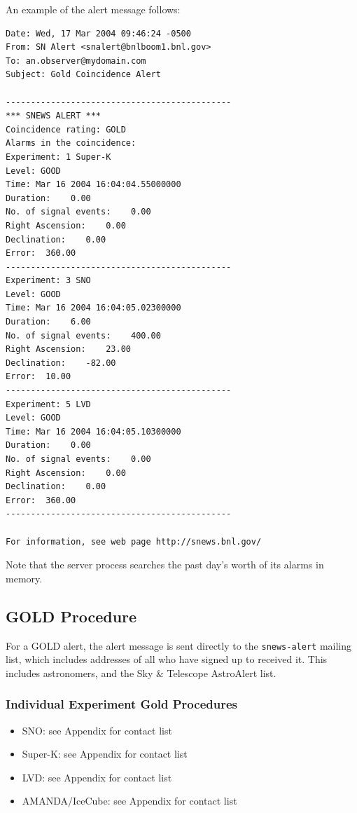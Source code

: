 \documentclass{article}
\begin{document}
An example of the alert message follows:

\begin{verbatim}
Date: Wed, 17 Mar 2004 09:46:24 -0500
From: SN Alert <snalert@bnlboom1.bnl.gov>
To: an.observer@mydomain.com
Subject: Gold Coincidence Alert

---------------------------------------------
*** SNEWS ALERT ***
Coincidence rating: GOLD
Alarms in the coincidence:
Experiment: 1 Super-K
Level: GOOD
Time: Mar 16 2004 16:04:04.55000000
Duration:    0.00
No. of signal events:    0.00
Right Ascension:    0.00
Declination:    0.00
Error:  360.00
---------------------------------------------
Experiment: 3 SNO
Level: GOOD 
Time: Mar 16 2004 16:04:05.02300000
Duration:    6.00
No. of signal events:    400.00
Right Ascension:    23.00
Declination:    -82.00
Error:  10.00
---------------------------------------------
Experiment: 5 LVD
Level: GOOD 
Time: Mar 16 2004 16:04:05.10300000
Duration:    0.00
No. of signal events:    0.00
Right Ascension:    0.00
Declination:    0.00
Error:  360.00
---------------------------------------------

For information, see web page http://snews.bnl.gov/

\end{verbatim}

Note that the server process searches the past day's worth of its
alarms in memory.  


\subsection{GOLD Procedure}\label{GOLD}

For a GOLD alert, the alert message is sent directly to the 
{\tt snews-alert} mailing list, which includes addresses of all
who have signed up to received it. This includes astronomers,
and the Sky \& Telescope AstroAlert list. 

\subsubsection{Individual Experiment Gold Procedures}

\begin{itemize}

\item SNO: see Appendix for contact list
\item Super-K: see Appendix for contact list
\item LVD: see Appendix for contact list
\item AMANDA/IceCube: see Appendix for contact list

\end{itemize}
\end{document}
